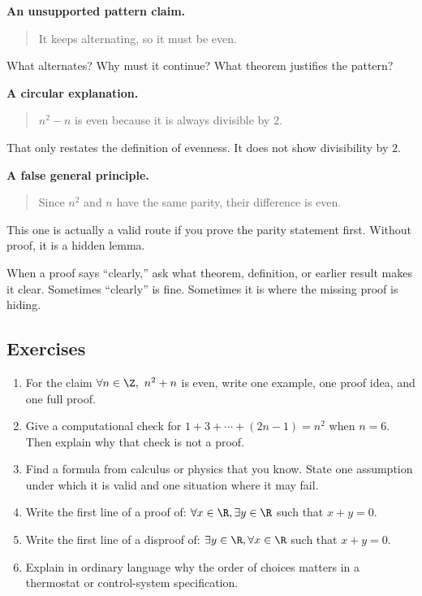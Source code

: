 \textbf{An unsupported pattern claim.}

\begin{quote}
It keeps alternating, so it must be even.
\end{quote}

What alternates? Why must it continue? What theorem justifies the pattern?

\textbf{A circular explanation.}

\begin{quote}
$n^2-n$ is even because it is always divisible by $2$.
\end{quote}

That only restates the definition of evenness. It does not show divisibility by $2$.

\textbf{A false general principle.}

\begin{quote}
Since $n^2$ and $n$ have the same parity, their difference is even.
\end{quote}

This one is actually a valid route if you prove the parity statement first. Without proof, it is a hidden lemma.

\begin{trapbox}
When a proof says ``clearly,'' ask what theorem, definition, or earlier result makes it clear. Sometimes ``clearly'' is fine. Sometimes it is where the missing proof is hiding.
\end{trapbox}

\subsection{Exercises}

\begin{enumerate}
\item For the claim $\forall n\in\Z,\ n^2+n$ is even, write one example, one proof idea, and one full proof.
\item Give a computational check for $1+3+\cdots+(2n-1)=n^2$ when $n=6$. Then explain why that check is not a proof.
\item Find a formula from calculus or physics that you know. State one assumption under which it is valid and one situation where it may fail.
\item Write the first line of a proof of: $\forall x\in\R,\exists y\in\R$ such that $x+y=0$.
\item Write the first line of a disproof of: $\exists y\in\R,\forall x\in\R$ such that $x+y=0$.
\item Explain in ordinary language why the order of choices matters in a thermostat or control-system specification.
\end{enumerate}

